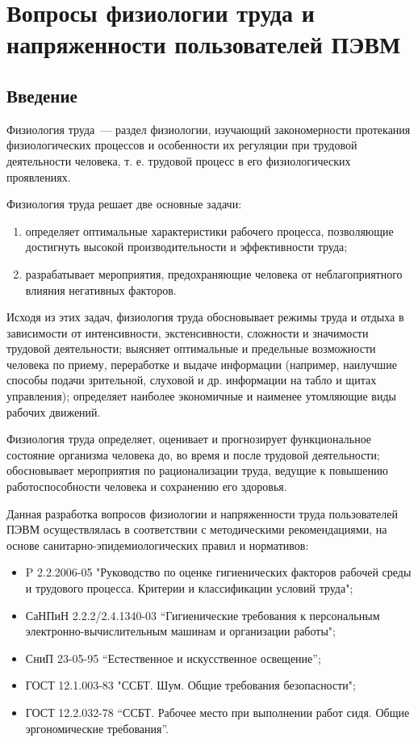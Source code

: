 \section{Вопросы физиологии труда и напряженности пользователей ПЭВМ}
\subsection{Введение}
Физиология труда~--- раздел физиологии, изучающий закономерности протекания физиологических процессов и особенности их регуляции при трудовой деятельности человека, т. е. трудовой процесс в его физиологических проявлениях. 

Физиология труда решает две основные задачи:
\begin{enumerate}
\item определяет оптимальные характеристики рабочего процесса, позволяющие достигнуть высокой производительности и эффективности труда;
\item разрабатывает мероприятия, предохраняющие человека от неблагоприятного влияния негативных факторов.
\end{enumerate}

Исходя из этих задач, физиология труда обосновывает режимы труда и отдыха в зависимости от интенсивности, экстенсивности, сложности и значимости трудовой деятельности; выясняет оптимальные и предельные возможности человека по приему, переработке и выдаче информации (например, наилучшие способы подачи зрительной, слуховой и др. информации на табло и щитах управления); определяет наиболее экономичные и наименее утомляющие виды рабочих движений.

Физиология труда определяет, оценивает и прогнозирует функциональное состояние организма человека до, во время и после трудовой деятельности; обосновывает мероприятия по рационализации труда, ведущие к повышению работоспособности человека и сохранению его здоровья.

Данная разработка вопросов физиологии и напряженности труда пользователей ПЭВМ осуществлялась в соответствии с методическими рекомендациями, на основе санитарно-эпидемиологических правил и нормативов:
\begin{itemize}
\item P 2.2.2006-05 "Руководство по оценке гигиенических факторов рабочей среды и трудового процесса. Критерии и классификации условий труда";
\item СаНПиН 2.2.2/2.4.1340-03 “Гигиенические требования к персональным электронно-вычислительным машинам и организации работы";
\item СниП 23-05-95 “Естественное и искусственное освещение”;
\item ГОСТ 12.1.003-83 "ССБТ. Шум. Общие требования безопасности";
\item ГОСТ 12.2.032-78 “ССБТ. Рабочее место при выполнении работ сидя. Общие эргономические требования”.
\end{itemize}

